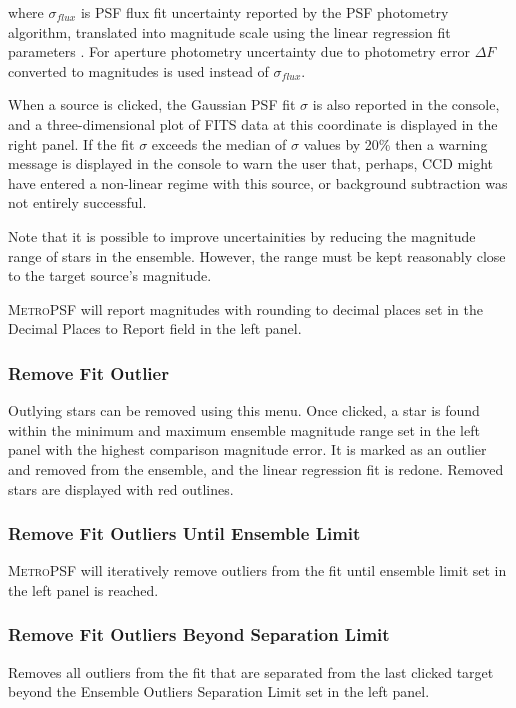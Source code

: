 \documentclass{article}
\begin{document}
where $\sigma_{flux}$ is PSF flux fit uncertainty reported by the PSF photometry algorithm, translated into magnitude scale using the linear regression fit parameters \citep{2010JAVSO..38..202P}. For aperture photometry uncertainty due to photometry error $\Delta F$ converted to magnitudes is used instead of $\sigma_{flux}$.

When a source is clicked, the Gaussian PSF fit $\sigma$ is also reported in the console, and a three-dimensional plot of FITS data at this coordinate is displayed in the right panel. If the fit $\sigma$ exceeds the median of $\sigma$ values by 20\% then a warning message is displayed in the console to warn the user that, perhaps, CCD might have entered a non-linear regime with this source, or background subtraction was not entirely successful. 

Note that it is possible to improve uncertainities by reducing the magnitude range of stars in the ensemble. However, the range must be kept reasonably close to the target source's magnitude. 

\textsc{MetroPSF} will report magnitudes with rounding to decimal places set in the Decimal Places to Report field in the left panel. 

\subsubsection{Remove Fit Outlier}
Outlying stars can be removed using this menu. Once clicked, a star is found within the minimum and maximum ensemble magnitude range set in the left panel with the highest comparison magnitude error. It is marked as an outlier and removed from the ensemble, and the linear regression fit is redone. Removed stars are displayed with red outlines. 

\subsubsection{Remove Fit Outliers Until Ensemble Limit}
\textsc{MetroPSF} will iteratively remove outliers from the fit until ensemble limit set in the left panel is reached. 

\subsubsection{Remove Fit Outliers Beyond Separation Limit}
Removes all outliers from the fit that are separated from the last clicked target beyond the Ensemble Outliers Separation Limit set in the left panel. 
\end{document}
